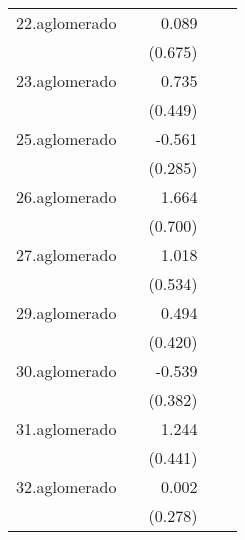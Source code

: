 {\begin{longtable}{l*{4}{D{.}{.}{-1}}}
\addlinespace
22.aglomerado&                     &       0.089         &                     &                     \\
            &                     &     (0.675)         &                     &                     \\
\addlinespace
23.aglomerado&                     &       0.735         &                     &                     \\
            &                     &     (0.449)         &                     &                     \\
\addlinespace
25.aglomerado&                     &      -0.561\sym{*}  &                     &                     \\
            &                     &     (0.285)         &                     &                     \\
\addlinespace
26.aglomerado&                     &       1.664\sym{*}  &                     &                     \\
            &                     &     (0.700)         &                     &                     \\
\addlinespace
27.aglomerado&                     &       1.018         &                     &                     \\
            &                     &     (0.534)         &                     &                     \\
\addlinespace
29.aglomerado&                     &       0.494         &                     &                     \\
            &                     &     (0.420)         &                     &                     \\
\addlinespace
30.aglomerado&                     &      -0.539         &                     &                     \\
            &                     &     (0.382)         &                     &                     \\
\addlinespace
31.aglomerado&                     &       1.244\sym{**} &                     &                     \\
            &                     &     (0.441)         &                     &                     \\
\addlinespace
32.aglomerado&                     &       0.002         &                     &                     \\
            &                     &     (0.278)         &                     &                     \\

\end{longtable}}
